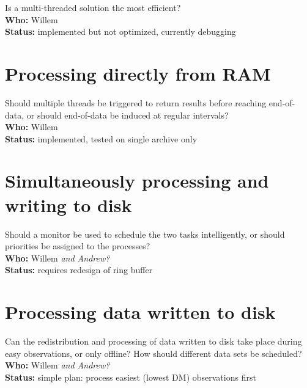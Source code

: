 Is a multi-threaded solution the most efficient? \\
{\bf Who:} Willem \\
{\bf Status:} implemented but not optimized, currently debugging

\section{Processing directly from RAM}

Should multiple threads be triggered to return results before reaching
end-of-data, or should end-of-data be induced at regular intervals? \\
{\bf Who:} Willem \\
{\bf Status:} implemented, tested on single archive only

\section{Simultaneously processing and writing to disk}

Should a monitor be used to schedule the two tasks intelligently, or
should priorities be assigned to the processes? \\
{\bf Who:} Willem {\it and Andrew?} \\
{\bf Status:} requires redesign of ring buffer

\section{Processing data written to disk}

Can the redistribution and processing of data written to disk take
place during easy observations, or only offline?  How should different
data sets be scheduled?  \\
{\bf Who:} Willem {\it and Andrew?} \\
{\bf Status:} simple plan: process easiest (lowest DM) observations first


